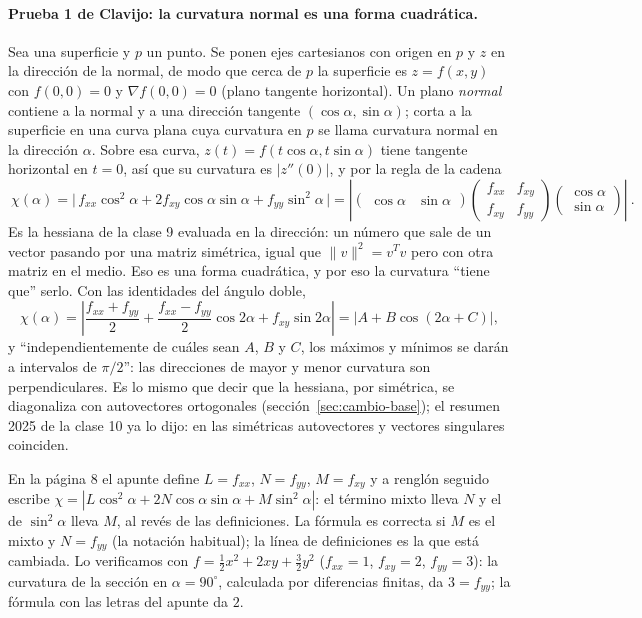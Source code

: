 \paragraph{Prueba 1 de Clavijo: la curvatura normal es una forma cuadrática.} Sea una
superficie y \(p\) un punto. Se ponen ejes cartesianos con origen en \(p\) y \(z\) en la
dirección de la normal, de modo que cerca de \(p\) la superficie es \(z=f(x,y)\) con
\(f(0,0)=0\) y \(\nabla f(0,0)=0\) (plano tangente horizontal). Un plano \emph{normal}
contiene a la normal y a una dirección tangente \((\cos\alpha,\sin\alpha)\); corta a la
superficie en una curva plana cuya curvatura en \(p\) se llama curvatura normal en la
dirección \(\alpha\). Sobre esa curva, \(z(t)=f(t\cos\alpha,t\sin\alpha)\) tiene tangente
horizontal en \(t=0\), así que su curvatura es \(|z''(0)|\), y por la regla de la cadena
\[
  \boxed{\ \chi(\alpha)=\bigl|\,f_{xx}\cos^2\alpha+2f_{xy}\cos\alpha\sin\alpha+f_{yy}\sin^2\alpha\,\bigr|
  =\left|\begin{pmatrix}\cos\alpha&\sin\alpha\end{pmatrix}
  \begin{pmatrix}f_{xx}&f_{xy}\\f_{xy}&f_{yy}\end{pmatrix}
  \begin{pmatrix}\cos\alpha\\\sin\alpha\end{pmatrix}\right|\ }.
\]
Es la hessiana de la clase 9 evaluada en la dirección: un número que sale de un vector
pasando por una matriz simétrica, igual que \(\|v\|^2=v^Tv\) pero con otra matriz en el
medio. Eso es una forma cuadrática, y por eso la curvatura ``tiene que'' serlo. Con las
identidades del ángulo doble,
\[
  \chi(\alpha)=\left|\frac{f_{xx}+f_{yy}}2+\frac{f_{xx}-f_{yy}}2\cos2\alpha+f_{xy}\sin2\alpha\right|
  =\bigl|A+B\cos(2\alpha+C)\bigr| ,
\]
y ``independientemente de cuáles sean \(A\), \(B\) y \(C\), los máximos y mínimos se darán
a intervalos de \(\pi/2\)'': las direcciones de mayor y menor curvatura son perpendiculares.
Es lo mismo que decir que la hessiana, por simétrica, se diagonaliza con autovectores
ortogonales (sección~\ref{sec:cambio-base}); el resumen 2025 de la clase 10 ya lo dijo:
en las simétricas autovectores y vectores singulares coinciden.

\begin{atencion}
En la página 8 el apunte define \(L=f_{xx}\), \(N=f_{yy}\), \(M=f_{xy}\) y a renglón
seguido escribe \(\chi=|L\cos^2\alpha+2N\cos\alpha\sin\alpha+M\sin^2\alpha|\): el término
mixto lleva \(N\) y el de \(\sin^2\alpha\) lleva \(M\), al revés de las definiciones. La
fórmula es correcta si \(M\) es el mixto y \(N=f_{yy}\) (la notación habitual); la línea de
definiciones es la que está cambiada. Lo verificamos con \(f=\tfrac12x^2+2xy+\tfrac32y^2\)
(\(f_{xx}=1\), \(f_{xy}=2\), \(f_{yy}=3\)): la curvatura de la sección en \(\alpha=90^\circ\),
calculada por diferencias finitas, da \(3=f_{yy}\); la fórmula con las letras del apunte
da \(2\).
\end{atencion}

